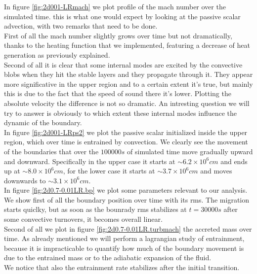 In figure \ref{fig:2d001-LRmach} we plot profile of the mach number over the simulated time. this is what one would expect by looking at the passive scalar advection, with two remarks that need to be done. \\
First of all the mach number slightly grows over time but not dramatically, thanks to the heating function that we implemented, featuring a decrease of heat generation as previously explained. \\
Second of all it is clear that some internal modes are excited by the convective blobs when they hit the stable layers and they propagate through it. They appear more significative in the upper region and to a certain extent it's true, but mainly this is due to the fact that the speed of sound there it's lower. Plotting the absolute velocity the difference is not so dramatic. An intresting question we will try to answer is obviously to which extent these internal modes influence the dynamic of the boundary. \\
In figure \ref{fig:2d001-LRps2} we plot the passive scalar initialized inside the upper region, which over time is entrained by convection. We clearly see the movement of the boundaries that over the $100000 s$ of simulated time move gradually upward and downward. Specifically in the upper case it starts at $\sim 6.2 \times 10^{6} cm $ and ends up at $\sim 8.0 \times 10^{6} cm$, for the lower case it starts at $\sim 3.7 \times 10^{6} cm$ and moves downwards to $\sim 3.1 \times 10^{6} cm$. \\
In figure \ref{fig:2d0.7-0.01LR.bp} we plot some parameters relevant to our analysis. \\
We show first of all the boundary position over time with its rms. The migration starts quiclky, but as soon as the bounrady rms stabilizes at $t=30000 s$ after some convective turnovers, it becomes overall linear. \\
Second of all we plot in figure \ref{fig:2d0.7-0.01LR.turbmach} the accreted mass over time. As already mentioned we will perform a lagrangian study of entrainment, because it is impracticable to quantify how much of the boundary movement is due to the entrained mass or to the adiabatic expansion of the fluid. \\ We notice that also the entrainment rate stabilizes after the initial transition.
